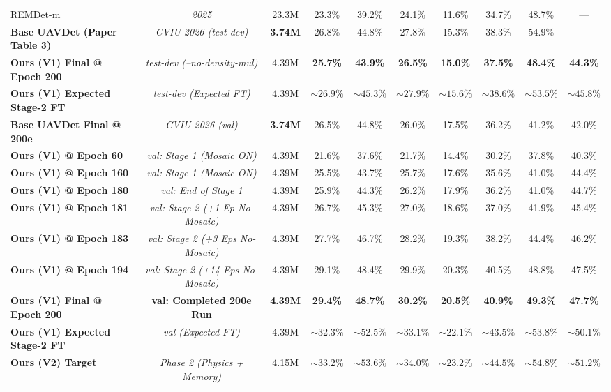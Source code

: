 \documentclass[11pt,a4paper]{article}
\begin{document}
\begin{table}[H]
{\begin{tabular}{l c c c c c c c c c}
REMDet-m~\cite{yang2026uavdet} & \emph{2025} & 23.3M & 23.3\% & 39.2\% & 24.1\% & 11.6\% & 34.7\% & 48.7\% & --- \\
\textbf{Base UAVDet (Paper Table 3)}~\cite{yang2026uavdet} & \emph{CVIU 2026 (test-dev)} & \textbf{3.74M} & 26.8\% & 44.8\% & 27.8\% & 15.3\% & 38.3\% & 54.9\% & --- \\
\textbf{Ours (V1) Final @ Epoch 200} & \emph{test-dev (--no-density-mul)} & 4.39M & \textbf{25.7\%} & \textbf{43.9\%} & \textbf{26.5\%} & \textbf{15.0\%} & \textbf{37.5\%} & \textbf{48.4\%} & \textbf{44.3\%} \\
\textbf{Ours (V1) Expected Stage-2 FT} & \emph{test-dev (Expected FT)} & 4.39M & $\bm{\sim 26.9\%}$ & $\bm{\sim 45.3\%}$ & $\bm{\sim 27.9\%}$ & $\bm{\sim 15.6\%}$ & $\bm{\sim 38.6\%}$ & $\bm{\sim 53.5\%}$ & $\bm{\sim 45.8\%}$ \\ \midrule
\textbf{Base UAVDet Final @ 200e}~\cite{yang2026uavdet} & \emph{CVIU 2026 (val)} & \textbf{3.74M} & 26.5\% & 44.8\% & 26.0\% & 17.5\% & 36.2\% & 41.2\% & 42.0\% \\
\textbf{Ours (V1) @ Epoch 60} & \emph{val: Stage 1 (Mosaic ON)} & 4.39M & 21.6\% & 37.6\% & 21.7\% & 14.4\% & 30.2\% & 37.8\% & 40.3\% \\
\textbf{Ours (V1) @ Epoch 160} & \emph{val: Stage 1 (Mosaic ON)} & 4.39M & 25.5\% & 43.7\% & 25.7\% & 17.6\% & 35.6\% & 41.0\% & 44.4\% \\
\textbf{Ours (V1) @ Epoch 180} & \emph{val: End of Stage 1} & 4.39M & 25.9\% & 44.3\% & 26.2\% & 17.9\% & 36.2\% & 41.0\% & 44.7\% \\
\textbf{Ours (V1) @ Epoch 181} & \emph{val: Stage 2 (+1 Ep No-Mosaic)} & 4.39M & 26.7\% & 45.3\% & 27.0\% & 18.6\% & 37.0\% & 41.9\% & 45.4\% \\
\textbf{Ours (V1) @ Epoch 183} & \emph{val: Stage 2 (+3 Eps No-Mosaic)} & 4.39M & 27.7\% & 46.7\% & 28.2\% & 19.3\% & 38.2\% & 44.4\% & 46.2\% \\
\textbf{Ours (V1) @ Epoch 194} & \emph{val: Stage 2 (+14 Eps No-Mosaic)} & 4.39M & 29.1\% & 48.4\% & 29.9\% & 20.3\% & 40.5\% & 48.8\% & 47.5\% \\
\textbf{Ours (V1) Final @ Epoch 200} & \textbf{val: Completed 200e Run} & \textbf{4.39M} & \textbf{29.4\%} & \textbf{48.7\%} & \textbf{30.2\%} & \textbf{20.5\%} & \textbf{40.9\%} & \textbf{49.3\%} & \textbf{47.7\%} \\
\textbf{Ours (V1) Expected Stage-2 FT} & \emph{val (Expected FT)} & 4.39M & $\bm{\sim 32.3\%}$ & $\bm{\sim 52.5\%}$ & $\bm{\sim 33.1\%}$ & $\bm{\sim 22.1\%}$ & $\bm{\sim 43.5\%}$ & $\bm{\sim 53.8\%}$ & $\bm{\sim 50.1\%}$ \\ \midrule
\textbf{Ours (V2) Target} & \emph{Phase 2 (Physics + Memory)} & 4.15M & $\bm{\sim 33.2\%}$ & $\bm{\sim 53.6\%}$ & $\bm{\sim 34.0\%}$ & $\bm{\sim 23.2\%}$ & $\bm{\sim 44.5\%}$ & $\bm{\sim 54.8\%}$ & $\bm{\sim 51.2\%}$ \\ \bottomrule
\end{tabular}%
}
\end{table}
\end{document}
